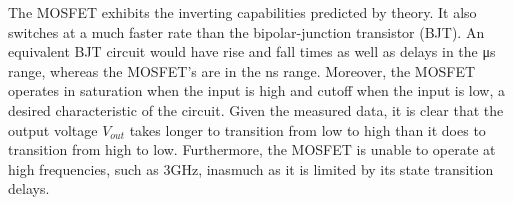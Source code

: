 The MOSFET exhibits the inverting capabilities predicted by theory. It also switches at a much faster rate than the bipolar-junction transistor (BJT). An equivalent BJT circuit would have rise and fall times as well as delays in the \si{\micro\second} range, whereas the MOSFET's are in the \si{\nano\second} range. Moreover, the MOSFET operates in saturation when the input is high and cutoff when the input is low, a desired characteristic of the circuit. Given the measured data, it is clear that the output voltage $V_{out}$ takes longer to transition from low to high than it does to transition from high to low. Furthermore, the MOSFET is unable to operate at high frequencies, such as $3$\si{\giga\hertz}, inasmuch as it is limited by its state transition delays.
